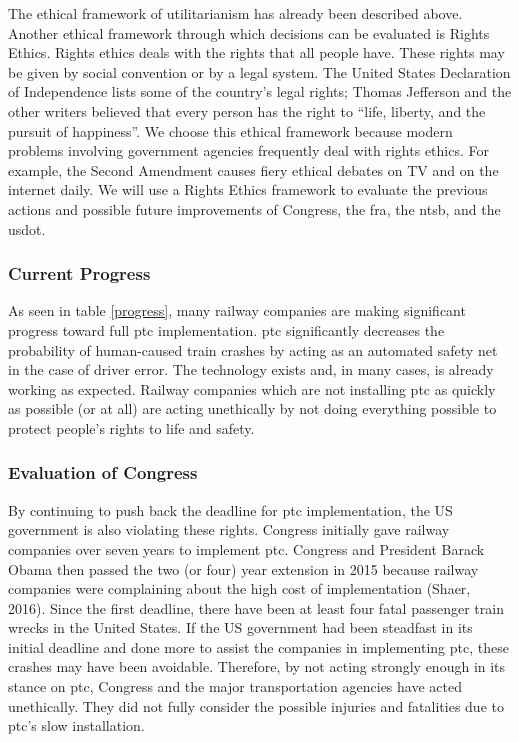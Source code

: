 \documentclass[11pt, titlepage]{article}
\begin{document}
The ethical framework of utilitarianism has already been described above. Another
ethical framework through which decisions can be evaluated is Rights Ethics. Rights
ethics deals with the rights that all people have. These rights may be given by
social convention or by a legal system. The United States Declaration of
Independence lists some of the country’s legal rights; Thomas Jefferson and the
other writers believed that every person has the right to ``life, liberty, and the
pursuit of happiness''. We choose this ethical framework because modern problems
involving government agencies frequently deal with rights ethics. For example, the
Second Amendment causes fiery ethical debates on TV and on the internet daily. We
will use a Rights Ethics framework to evaluate the previous actions and possible
future improvements of Congress, the \gls{fra}, the \gls{ntsb}, and the
\gls{usdot}.

\subsubsection{Current Progress}

As seen in table \ref{progress}, many railway companies are making significant
progress toward full \gls{ptc} implementation. \gls{ptc} significantly decreases the
probability of human-caused train crashes by acting as an automated safety net in
the case of driver error. The technology exists and, in many cases, is already
working as expected. Railway companies which are not installing \gls{ptc} as quickly
as possible (or at all) are acting unethically by not doing everything possible to
protect people’s rights to life and safety.

\subsubsection{Evaluation of Congress}

By continuing to push back the deadline for \gls{ptc} implementation, the US
government is also violating these rights. Congress initially gave railway companies
over seven years to implement \gls{ptc}. Congress and President Barack Obama then
passed the two (or four) year extension in 2015 because railway companies were
complaining about the high cost of implementation (Shaer, 2016). Since the first
deadline, there have been at least four fatal passenger train wrecks in the United
States. If the US government had been steadfast in its initial deadline and done
more to assist the companies in implementing \gls{ptc}, these crashes may have been
avoidable. Therefore, by not acting strongly enough in its stance on \gls{ptc},
Congress and the major transportation agencies have acted unethically. They did not
fully consider the possible injuries and fatalities due to \gls{ptc}’s slow
installation.
\end{document}
